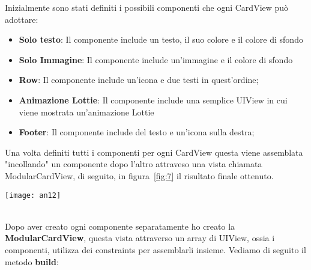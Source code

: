 Inizialmente sono stati definiti i possibili componenti che ogni CardView può adottare:
\begin{itemize}
    \item\textbf{Solo testo}: Il componente include un testo, il suo colore e il colore di sfondo
    \item\textbf{Solo Immagine}: Il componente include un'immagine e il colore di sfondo
    \item\textbf{Row}: Il componente include un'icona e due testi in quest'ordine;
    \item\textbf{Animazione Lottie\cite{lottie}}: Il componente include una semplice UIView in cui viene mostrata un'animazione Lottie
    \item\textbf{Footer}: Il componente include del testo e un'icona sulla destra;
\end{itemize}

Una volta definiti tutti i componenti per ogni CardView questa viene assemblata "incollando" un componente
dopo l'altro attraveso una vista chiamata ModularCardView, di seguito, in figura~\ref{fig:7} il risultato finale ottenuto. \\

\begin{minipage}{\linewidth}
    \centering
    \texttt{[image: an12]}
    \label{fig:7}
\end{minipage}\\

Dopo aver creato ogni componente separatamente ho creato la \textbf{ModularCardView},
questa vista attraverso un array di UIView, ossia i componenti, utilizza dei constraints 
per assemblarli insieme. Vediamo di seguito il metodo \textbf{build}:

